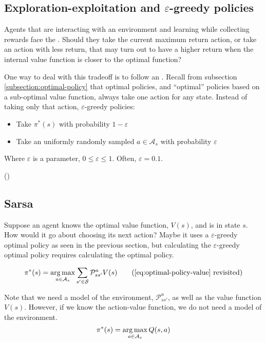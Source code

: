 \subsection{Exploration-exploitation and \texorpdfstring{$\varepsilon$}{ε}-greedy policies}
Agents that are interacting with an environment and learning while collecting
rewards face the . Should they take the
current maximum return action, or take an action with less return, that may turn
out to have a higher return when the internal value function is closer to the
optimal function?

One way to deal with this tradeoff is to follow an
.
Recall from subsection \ref{subsection:optimal-policy} that optimal policies,
and ``optimal'' policies based on a sub-optimal value function, always take one
action for any state. Instead of taking only that action, $\varepsilon$-greedy
policies:
\begin{itemize}
\item Take $\pi^*(s)$ with probability $1-\varepsilon$
\item Take an uniformly randomly sampled $a\in\mathcal{A}_s$ with probability
$\varepsilon$
\end{itemize}
Where $\varepsilon$ is a parameter, $0\leq\varepsilon\leq 1$. Often,
$\varepsilon=0.1$.

(\cite[Section~2.2]{sutton1998introduction})

\subsection{Sarsa\label{subsection:sarsa}}

Suppose an agent knows the optimal value function, $V(s)$, and is in state $s$.
How would it go about choosing its next action? Maybe it uses a
$\varepsilon$-greedy optimal policy as seen in the previous section, but
calculating the $\varepsilon$-greedy optimal policy requires calculating the
optimal policy.

\begin{equation}
  \pi^*(s) = \argmax_{a\in\mathcal{A}_s} \sum_{s'\in\mathcal{S}}\mathcal{P}^a_{ss'}V(s)
  \tag{\ref{eq:optimal-policy-value} revisited}
\end{equation}

Note that we need a model of the environment, $\mathcal{P}^a_{ss'}$, as well as the
value function $V(s)$. However, if we know the action-value function, we do not
need a model of the environment.
\begin{equation}
  \pi^*(s) = \argmax_{a\in\mathcal{A}_s} Q(s, a)
  \label{eq:q-policy}
\end{equation}


